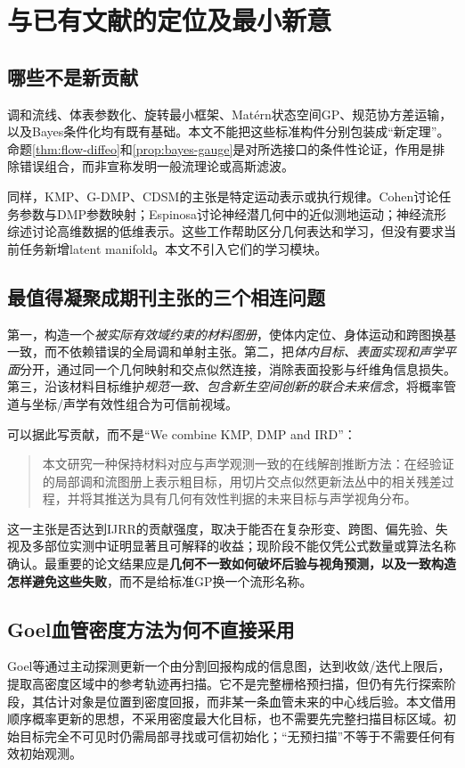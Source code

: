 \documentclass[UTF8,11pt,a4paper,fontset=fandol]{ctexart}
\numberwithin{equation}{section}
\theoremstyle{plain}
\theoremstyle{definition}
\theoremstyle{remark}
\begin{document}
\section{与已有文献的定位及最小新意}\label{sec:novelty}
\subsection{哪些不是新贡献}
调和流线、体表参数化、旋转最小框架、Mat\'ern状态空间GP、规范协方差运输，以及Bayes条件化均有既有基础\cite{Jones2000,Yezzi2003,Floater2003,Wang2008,Hartikainen2010,Hutchinson2021}。本文不能把这些标准构件分别包装成“新定理”。命题\ref{thm:flow-diffeo}和\ref{prop:bayes-gauge}是对所选接口的条件性论证，作用是排除错误组合，而非宣称发明一般流理论或高斯滤波。

同样，KMP、G-DMP、CDSM的主张是特定运动表示或执行规律\cite{Huang2019,AbuDakka2024,Bakker2026}。Cohen讨论任务参数与DMP参数映射；Espinosa讨论神经潜几何中的近似测地运动；神经流形综述讨论高维数据的低维表示\cite{Cohen2021,Espinosa2026,Mitchell2022}。这些工作帮助区分几何表达和学习，但没有要求当前任务新增latent manifold。本文不引入它们的学习模块。

\subsection{最值得凝聚成期刊主张的三个相连问题}
第一，构造一个\emph{被实际有效域约束的材料图册}，使体内定位、身体运动和跨图换基一致，而不依赖错误的全局调和单射主张。第二，把\emph{体内目标、表面实现和声学平面}分开，通过同一个几何映射和交点似然连接，消除表面投影与纤维角信息损失。第三，沿该材料目标维护\emph{规范一致、包含新生空间创新的联合未来信念}，将概率管道与坐标/声学有效性组合为可信前视域。

可以据此写贡献，而不是“We combine KMP, DMP and IRD”：
\begin{quote}
本文研究一种保持材料对应与声学观测一致的在线解剖推断方法：在经验证的局部调和流图册上表示粗目标，用切片交点似然更新法丛中的相关残差过程，并将其推送为具有几何有效性判据的未来目标与声学视角分布。
\end{quote}

这一主张是否达到IJRR的贡献强度，取决于能否在复杂形变、跨图、偏先验、失视及多部位实测中证明显著且可解释的收益；现阶段不能仅凭公式数量或算法名称确认。最重要的论文结果应是\textbf{几何不一致如何破坏后验与视角预测，以及一致构造怎样避免这些失败}，而不是给标准GP换一个流形名称。

\subsection{Goel血管密度方法为何不直接采用}
Goel等\cite{Goel2022}通过主动探测更新一个由分割回报构成的信息图，达到收敛/迭代上限后，提取高密度区域中的参考轨迹再扫描。它不是完整栅格预扫描，但仍有先行探索阶段，其估计对象是位置到密度回报，而非某一条血管未来的中心线后验。本文借用顺序概率更新的思想，不采用密度最大化目标，也不需要先完整扫描目标区域。初始目标完全不可见时仍需局部寻找或可信初始化；“无预扫描”不等于不需要任何有效初始观测。
\end{document}
